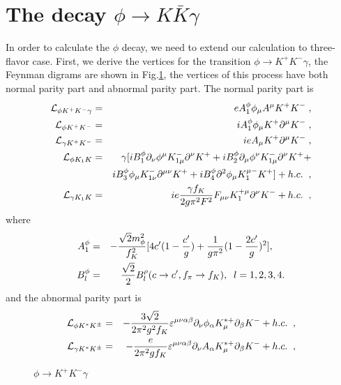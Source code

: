 \section{The decay $\phi\rightarrow K \bar{K}\gamma$}
In order to calculate the $\phi$ decay, we need to extend our calculation
to three-flavor case. First, we derive the vertices for the transition
$\phi\rightarrow K^+ K^- \gamma$, the Feynman digrams are shown in
Fig.\ref{figure:0(c)}, the vertices of this  process have both normal
parity part and abnormal parity part. The normal parity part is
\begin{eqnarray}                       
{\cal L}_{\phi K^+ K^- \gamma}
&=&eA_1^\phi\phi_\mu A^\mu K^+K^- 
{\;},\\
{\cal L}_{\phi K^+ K^-}&=&i A_1^\phi\phi_\mu K^+\partial^\mu K^- 
{\;},\\
{\cal L}_{\gamma K^+K^-}&=&ieA_\mu K^+\partial^\mu K^- {\;},\\
{\cal L}_{\phi K_1 K}&=&\gamma[
iB_1^\phi\partial_\nu\phi^\mu K_{1\mu}^- \partial^\nu K^+ +
iB_2^\phi\partial_\mu\phi^\nu K_{1\mu}^- \partial^\nu K^+ + \nonumber \\
& &iB_3^\phi\phi_\mu K_{1\nu}^-\partial^{\mu\nu}K^+ +
iB_4^\phi\partial^2\phi_\mu K_1^{\mu -}K^+]+ h.c. {\;\;},\\
{\cal L}_{\gamma K_1
K}&=&ie\frac{\gamma f_K}{2g\pi^2 F^2}F_{\mu\nu}K_1^{+\mu}\partial^\nu K^-
+ h.c.{\;\;},
\end{eqnarray} 
where
\begin{eqnarray}
A_1^\phi&=&-\frac{\sqrt2 m_\phi^2}{f_K^2}
[4c'(1-{c'\over g})+{1\over {g\pi^2}}(1-{2c' \over g})^2]
,{\;\;\;\;}
\nonumber \\
B_l^\phi&=&\frac{\sqrt 2}{2}{B_l^\rho (c\rightarrow c',f_\pi \rightarrow
f_K)}, {\;\;} l=1,2,3,4.
\end{eqnarray}
and the abnormal parity part is
\begin{eqnarray}
{\cal L}_{\phi K^* K^{\pm}}&=&
-\frac{3 \sqrt 2}{2\pi^2 g^2 f_K}\varepsilon^{\mu\nu\alpha\beta}
\partial_\nu\phi_\alpha K^{*+}_\mu\partial_\beta K^- +h.c.{\;\;},\\
{\cal L}_{\gamma K^* K^{\pm}}&=&
- \frac{e}{2\pi^2 g f_K}\varepsilon^{\mu\nu\alpha\beta}
\partial_\nu A_\alpha K^{*+}_\mu\partial_\beta K^-  + h.c.{\;\;},
\end{eqnarray}
\begin{figure}[h]
   \centering
   \caption{$\phi \rightarrow K^+ K^-\gamma$}                     
   \label{figure:0(c)}
\end{figure}

